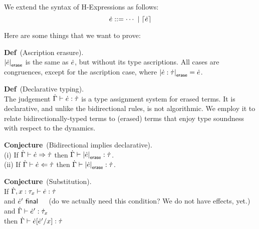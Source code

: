 %
%
%

We extend the syntax of H-Expressions as follows:
\[
\dot{e} ::= \cdots~|~\lceil\dot{e}\rceil
\]

Here are some things that we want to prove:

\textbf{Def}~(Ascription erasure). 
\\
$\left|\dot{e}\right|_\textsf{erase}$ is the same as $\dot{e}$, but without its type ascriptions.
%
All cases are congruences, except for the ascription case, where $\left|\dot{e} : \dot{\tau}\right|_\textsf{erase} = \dot{e}$.

\textbf{Def}~(Declarative typing).
\\
The judgement $\dot{\Gamma} \vdash \dot{e} : \dot{\tau}$ is a type assignment
system for erased terms.  It is declarative, and unlike the
bidirectional rules, is not algorithmic.
%
We employ it to relate bidirectionally-typed terms to (erased) terms
that enjoy type soundness with respect to the dynamics.

\textbf{Conjecture}~(Bidirectional implies declarative).
\\
(i) If $\dot{\Gamma} \vdash \dot{e} \Rightarrow \dot{\tau}$ then $\dot{\Gamma} \vdash \left|\dot{e}\right|_\textsf{erase} : \dot{\tau}$.
\\
(ii) If $\dot{\Gamma} \vdash \dot{e} \Leftarrow \dot{\tau}$ then $\dot{\Gamma} \vdash \left|\dot{e}\right|_\textsf{erase} : \dot{\tau}$.

\textbf{Conjecture}~(Substitution).
\\
If $\dot{\Gamma}, x : \tau_x \vdash \dot{e} : \dot{\tau}$
\\
and $\dot{e}'~\textsf{final}$~~~(do we actually need this condition? We do not have effects, yet.)
\\
and $\dot{\Gamma} \vdash \dot{e}' : \dot{\tau}_x$
\\
then $\dot{\Gamma} \vdash \dot{e}[\dot{e}' / x] : \dot{\tau}$

